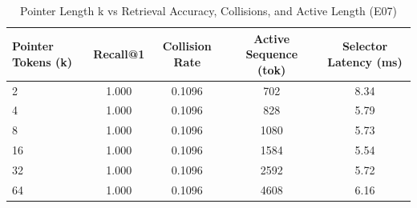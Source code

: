 \begin{table}
\caption{Pointer Length k vs Retrieval Accuracy, Collisions, and Active Length (E07)}
\label{tab:ablation_k}
\begin{tabular}{lcccc}
\toprule
Pointer Tokens (k) & Recall@1 & Collision Rate & Active Sequence (tok) & Selector Latency (ms) \\
\midrule
2 & 1.000 & 0.1096 & 702 & 8.34 \\
4 & 1.000 & 0.1096 & 828 & 5.79 \\
8 & 1.000 & 0.1096 & 1080 & 5.73 \\
16 & 1.000 & 0.1096 & 1584 & 5.54 \\
32 & 1.000 & 0.1096 & 2592 & 5.72 \\
64 & 1.000 & 0.1096 & 4608 & 6.16 \\
\bottomrule
\end{tabular}
\end{table}
